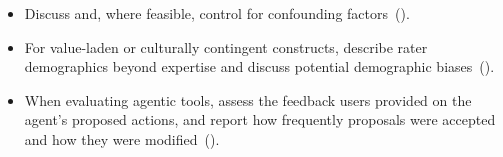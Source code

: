 \begin{itemize}[label={},leftmargin=*]
    \item \iconS {} Discuss and, where feasible, control for confounding factors~().
    \item \iconS {} For value-laden or culturally contingent constructs, describe rater demographics beyond expertise and discuss potential demographic biases~().
    \item \iconS {} When evaluating agentic tools, assess the feedback users provided on the agent's proposed actions, and report how frequently proposals were accepted and how they were modified~().
\end{itemize}

